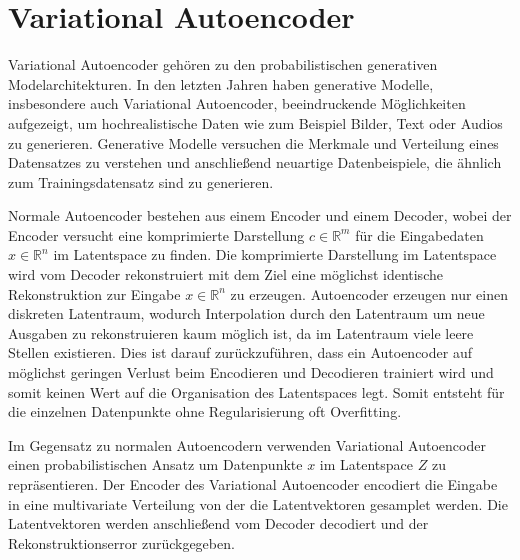 \section{Variational Autoencoder}\raggedbottom
Variational Autoencoder \citep{kingma2014autoencoding} gehören zu den probabilistischen generativen Modelarchitekturen. In den letzten Jahren haben generative Modelle, insbesondere auch Variational Autoencoder, beeindruckende Möglichkeiten aufgezeigt, um hochrealistische Daten wie zum Beispiel Bilder, Text oder Audios zu generieren.
Generative Modelle versuchen die Merkmale und Verteilung eines Datensatzes zu verstehen und anschließend neuartige Datenbeispiele, die ähnlich zum Trainingsdatensatz sind zu generieren.

Normale Autoencoder bestehen aus einem Encoder und einem Decoder, wobei der Encoder versucht eine komprimierte Darstellung $c \in \mathbb{R}^{m}$ für die Eingabedaten $x \in \mathbb{R}^{n}$ im Latentspace zu finden. Die komprimierte Darstellung im Latentspace wird vom Decoder rekonstruiert mit dem Ziel eine möglichst identische Rekonstruktion zur Eingabe $x \in \mathbb{R}^{n}$ zu erzeugen.
Autoencoder erzeugen nur einen diskreten Latentraum, wodurch Interpolation durch den Latentraum um neue Ausgaben zu rekonstruieren kaum möglich ist, da im Latentraum viele leere Stellen existieren. Dies ist darauf zurückzuführen, dass ein Autoencoder auf möglichst geringen Verlust beim Encodieren und Decodieren trainiert wird und somit keinen Wert auf die Organisation des Latentspaces legt. Somit entsteht für die einzelnen Datenpunkte ohne Regularisierung oft Overfitting.

Im Gegensatz zu normalen Autoencodern verwenden Variational Autoencoder einen probabilistischen Ansatz um Datenpunkte $x$ im Latentspace $Z$ zu repräsentieren. 
Der Encoder des Variational Autoencoder encodiert die Eingabe in eine multivariate Verteilung von der die Latentvektoren gesamplet werden. Die Latentvektoren werden anschließend vom Decoder decodiert und der Rekonstruktionserror zurückgegeben.

